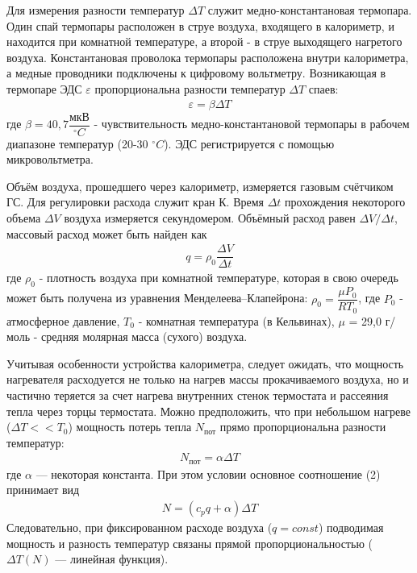 \documentclass[a4paper, 12pt]{article}%
\begin{document}
Для измерения разности температур $\Delta T$ служит медно-константановая термопара. Один спай термопары расположен в струе воздуха, входящего в калориметр, и находится при комнатной температуре, а второй - в струе выходящего нагретого воздуха. Константановая проволока термопары расположена внутри калориметра, а медные проводники подключены к цифровому вольтметру. Возникающая в термопаре ЭДС $\varepsilon$ пропорциональна разности температур $\Delta T$ спаев:
\begin{equation}
\begin{aligned}
\varepsilon = \beta \Delta T
\end{aligned}
\end{equation}
где $\beta = 40,7 \dfrac{\text{мкВ}}{ ^{\circ} C}$ - чувствительность медно-константановой термопары в рабочем диапазоне температур (20-30 $ ^{\circ} C$). ЭДС регистрируется с помощью микровольтметра.

Объём воздуха, прошедшего через калориметр, измеряется газовым счётчиком ГС. Для регулировки расхода служит кран К. Время $\Delta t$ прохождения некоторого объема $\Delta V$ воздуха измеряется секундомером. Объёмный расход равен $\Delta V / \Delta t$, массовый расход может быть найден как
\begin{equation}
\begin{aligned}
q = \rho_0 \dfrac{\Delta V}{\Delta t} 
\end{aligned}
\end{equation}
где $\rho_0$ - плотность воздуха при комнатной температуре, которая в свою очередь может быть получена из уравнения Менделеева–Клапейрона: $\rho_0 = \dfrac{\mu P_0}{RT_0}$, где $P_0$ - атмосферное давление, $T_0$ - комнатная температура (в Кельвинах), $\mu$ = 29,0 г/моль - средняя молярная масса (сухого) воздуха.

Учитывая особенности устройства калориметра, следует ожидать, что мощность нагревателя расходуется не только на нагрев массы прокачиваемого воздуха, но и частично теряется за счет нагрева внутренних стенок термостата и рассеяния тепла через торцы термостата. Можно предположить, что при небольшом нагреве ($\Delta T << T_0$) мощность потерь тепла $N_{\text{пот}}$ прямо пропорциональна разности температур:
\begin{equation}
\begin{aligned}
N_{\text{пот}} = \alpha \Delta T
\end{aligned}
\end{equation}
где $\alpha$ — некоторая константа. При этом условии основное соотношение (2) принимает вид
\begin{equation}
\begin{aligned}
N = (c_p q+ \alpha) \Delta T
\end{aligned}
\end{equation}
Следовательно, при фиксированном расходе воздуха ($q = const$) подводимая мощность и разность температур связаны прямой пропорциональностью ($\Delta T (N)$ — линейная функция).
\end{document}
